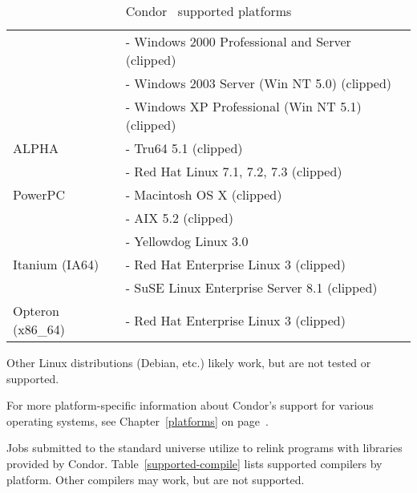 \begin{center}
\begin{table}[hbt]
\begin{tabular}{|p{6cm}p{7cm}|}
 & - Windows 2000 Professional and Server (clipped) \\
 & - Windows 2003 Server (Win NT 5.0) (clipped) \\
 & - Windows XP Professional (Win NT 5.1) (clipped) \\ \hline
ALPHA & - Tru64 5.1 (clipped) \\
 & - Red Hat Linux 7.1, 7.2, 7.3 (clipped) \\ \hline
PowerPC & - Macintosh OS X (clipped) \\
 & - AIX 5.2 (clipped) \\
 & - Yellowdog Linux 3.0 \\ \hline
Itanium (IA64) & - Red Hat Enterprise Linux 3 (clipped) \\
 & - SuSE Linux Enterprise Server 8.1 (clipped) \\ \hline
Opteron (x86\_64) & - Red Hat Enterprise Linux 3 (clipped) \\ \hline
\end{tabular}
\caption{\label{supported-platforms}Condor \VersionNotice\ supported platforms}
\end{table}
\end{center}


\Note Other Linux distributions (Debian, etc.) likely work, but are not tested
or supported.

For more platform-specific information about Condor's support for
various operating systems, see Chapter~\ref{platforms} on
page~\pageref{platforms}. 



Jobs submitted to the standard universe utilize 
to relink programs with libraries provided by Condor.
Table~\ref{supported-compile} lists supported compilers by
platform.
Other compilers may work, but are not supported.


